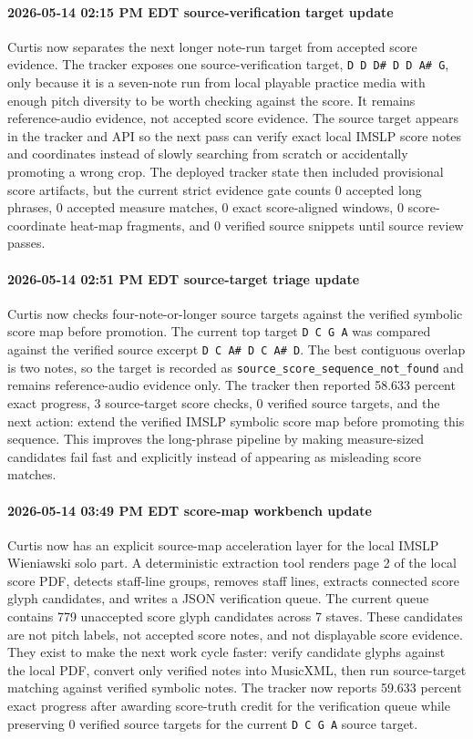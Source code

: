 \paragraph{2026-05-14 02:15 PM EDT source-verification target update} Curtis now separates the next longer note-run target from accepted score evidence. The tracker exposes one source-verification target, \texttt{D D D\# D D A\# G}, only because it is a seven-note run from local playable practice media with enough pitch diversity to be worth checking against the score. It remains reference-audio evidence, not accepted score evidence. The source target appears in the tracker and API so the next pass can verify exact local IMSLP score notes and coordinates instead of slowly searching from scratch or accidentally promoting a wrong crop. The deployed tracker state then included provisional score artifacts, but the current strict evidence gate counts 0 accepted long phrases, 0 accepted measure matches, 0 exact score-aligned windows, 0 score-coordinate heat-map fragments, and 0 verified source snippets until source review passes.

\paragraph{2026-05-14 02:51 PM EDT source-target triage update} Curtis now checks four-note-or-longer source targets against the verified symbolic score map before promotion. The current top target \texttt{D C G A} was compared against the verified source excerpt \texttt{D C A\# D C A\# D}. The best contiguous overlap is two notes, so the target is recorded as \texttt{source\_score\_sequence\_not\_found} and remains reference-audio evidence only. The tracker then reported 58.633 percent exact progress, 3 source-target score checks, 0 verified source targets, and the next action: extend the verified IMSLP symbolic score map before promoting this sequence. This improves the long-phrase pipeline by making measure-sized candidates fail fast and explicitly instead of appearing as misleading score matches.

\paragraph{2026-05-14 03:49 PM EDT score-map workbench update} Curtis now has an explicit source-map acceleration layer for the local IMSLP Wieniawski solo part. A deterministic extraction tool renders page 2 of the local score PDF, detects staff-line groups, removes staff lines, extracts connected score glyph candidates, and writes a JSON verification queue. The current queue contains 779 unaccepted score glyph candidates across 7 staves. These candidates are not pitch labels, not accepted score notes, and not displayable score evidence. They exist to make the next work cycle faster: verify candidate glyphs against the local PDF, convert only verified notes into MusicXML, then run source-target matching against verified symbolic notes. The tracker now reports 59.633 percent exact progress after awarding score-truth credit for the verification queue while preserving 0 verified source targets for the current \texttt{D C G A} source target.

